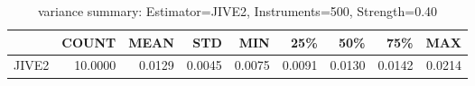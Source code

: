 \begin{table}[ht]
\centering
\caption{variance summary: Estimator=JIVE2, Instruments=500, Strength=0.40}
\begin{tabular}{lrrrrrrrr}
\toprule
 & COUNT & MEAN & STD & MIN & 25\% & 50\% & 75\% & MAX \\
\midrule
JIVE2 & 10.0000 & 0.0129 & 0.0045 & 0.0075 & 0.0091 & 0.0130 & 0.0142 & 0.0214 \\
\bottomrule
\end{tabular}
\end{table}
